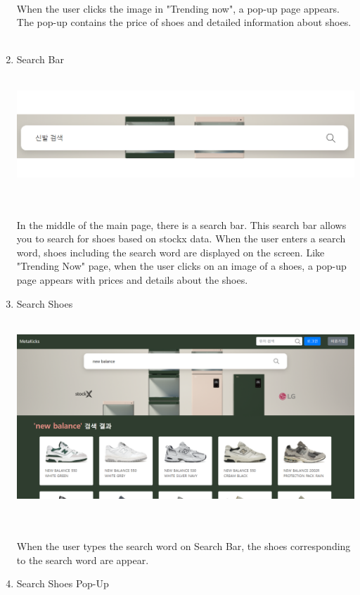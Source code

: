 \documentclass[conference]{IEEEtran}
\begin{document}
\begin{enumerate}
\\When the user clicks the image in "Trending now", a pop-up page appears. The pop-up contains the price of shoes and detailed information about shoes.\\\\
	\item Search Bar \\\\
\centerline{\includegraphics[scale=0.35]{pics/searchbar.png}}\\\\
In the middle of the main page, there is a search bar. This search bar allows you to search for shoes based on stockx data. When the user enters a search word, shoes including the search word are displayed on the screen. Like "Trending Now" page, when the user clicks on an image of a shoes, a pop-up page appears with prices and details about the shoes.\\
	\item Search Shoes \\\\
\centerline{\includegraphics[scale=0.24]{pics/search_screen.png}}\\\\
When the user types the search word on Search Bar, the shoes corresponding to the search word are appear.\\
	\item Search Shoes Pop-Up\\\\

\end{enumerate}
\end{document}
